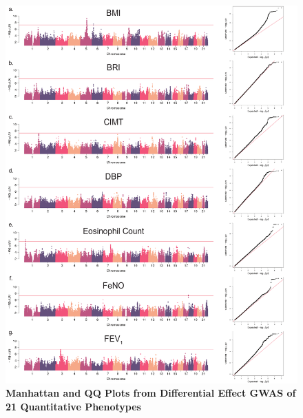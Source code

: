 \begin{figure}[!htb]
	\ContinuedFloat*
	\centering
	\includegraphics[width=5in]{img/ch02/fig-s7a.pdf}
	\caption[Manhattan and QQ Plots from Differential Effect GWAS of 21 Quantitative Phenotypes]{\textbf{Manhattan and QQ Plots from Differential Effect GWAS of 21 Quantitative Phenotypes} }
	\label{fig:fig-s7a}
\end{figure}


